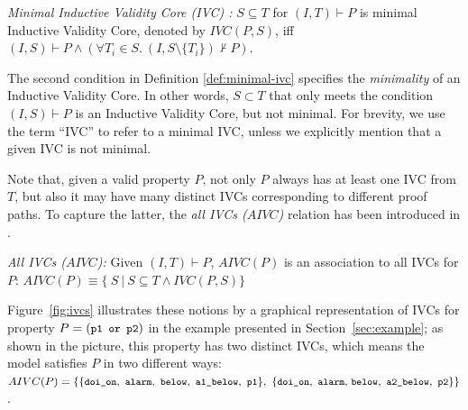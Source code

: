 \begin{definition}{\emph{Minimal Inductive Validity Core (IVC) \cite{Ghass16}:}}
  \label{def:minimal-ivc}
  $S \subseteq T$ for $(I, T)\vdash P$ is minimal Inductive Validity Core,
  denoted by $IVC(P, S)$, iff
  $(I, S) \vdash P \wedge (\forall T_i \in S.~ (I, S\setminus\{ T_i \}) \nvdash P) $.
\end{definition}

\noindent The second condition in Definition \ref{def:minimal-ivc} 
specifies the \emph{minimality} of an Inductive Validity Core. 
In other words, $S \subset T$ that only meets the condition $(I, S) \vdash P$ is 
an Inductive Validity Core, but not minimal. 
For brevity, we use the term ``IVC'' to refer to a minimal IVC, unless 
we explicitly mention that a given IVC is not minimal.  

Note that, given a valid property $P$, not only $P$ always has at least one IVC from $T$, but also it may have many distinct IVCs corresponding to different proof paths. To capture the latter, the \emph{all IVCs ($AIVC$)} relation has been introduced in \cite{Ghass16, Murugesan16:renext, Ghass17Cov}.
\begin{definition}{\emph{All IVCs ($AIVC$)\cite{Murugesan16:renext, Ghass17Cov}:}}
    \label{def:allivcs}
    Given $(I, T) \vdash P$, $AIVC(P)$ is an association to all IVCs for $P$:
    $AIVC(P) \equiv  \{\ S~|~S \subseteq T \land  IVC(P, S)\} $
\end{definition}

Figure~\ref{fig:ivcs} illustrates these notions by a graphical representation of IVCs for property $P = (\small{\texttt{p1 or p2}})$ in the example presented in Section~\ref{sec:example}; as shown in the picture, this property has two distinct IVCs, which means the model satisfies $P$ in two different ways:
$AIVC(P) = \{ \{ \small{ \texttt{doi\_on},
~\texttt{alarm},~\texttt{below},~\texttt{a1\_below},~\texttt{p1}\},~
\{ \texttt{doi\_on},~\texttt{alarm},}  \allowbreak \small{
~\texttt{below},~\texttt{a2\_below},~\texttt{p2}\} }\}$.


